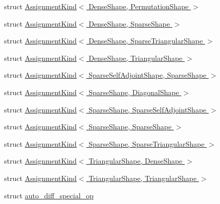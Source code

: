\begin{DoxyCompactItemize}
\item 
struct \hyperlink{struct_eigen_1_1internal_1_1_assignment_kind_3_01_dense_shape_00_01_permutation_shape_01_4}{Assignment\+Kind$<$ Dense\+Shape, Permutation\+Shape $>$}
\item 
struct \hyperlink{struct_eigen_1_1internal_1_1_assignment_kind_3_01_dense_shape_00_01_sparse_shape_01_4}{Assignment\+Kind$<$ Dense\+Shape, Sparse\+Shape $>$}
\item 
struct \hyperlink{struct_eigen_1_1internal_1_1_assignment_kind_3_01_dense_shape_00_01_sparse_triangular_shape_01_4}{Assignment\+Kind$<$ Dense\+Shape, Sparse\+Triangular\+Shape $>$}
\item 
struct \hyperlink{struct_eigen_1_1internal_1_1_assignment_kind_3_01_dense_shape_00_01_triangular_shape_01_4}{Assignment\+Kind$<$ Dense\+Shape, Triangular\+Shape $>$}
\item 
struct \hyperlink{struct_eigen_1_1internal_1_1_assignment_kind_3_01_sparse_self_adjoint_shape_00_01_sparse_shape_01_4}{Assignment\+Kind$<$ Sparse\+Self\+Adjoint\+Shape, Sparse\+Shape $>$}
\item 
struct \hyperlink{struct_eigen_1_1internal_1_1_assignment_kind_3_01_sparse_shape_00_01_diagonal_shape_01_4}{Assignment\+Kind$<$ Sparse\+Shape, Diagonal\+Shape $>$}
\item 
struct \hyperlink{struct_eigen_1_1internal_1_1_assignment_kind_3_01_sparse_shape_00_01_sparse_self_adjoint_shape_01_4}{Assignment\+Kind$<$ Sparse\+Shape, Sparse\+Self\+Adjoint\+Shape $>$}
\item 
struct \hyperlink{struct_eigen_1_1internal_1_1_assignment_kind_3_01_sparse_shape_00_01_sparse_shape_01_4}{Assignment\+Kind$<$ Sparse\+Shape, Sparse\+Shape $>$}
\item 
struct \hyperlink{struct_eigen_1_1internal_1_1_assignment_kind_3_01_sparse_shape_00_01_sparse_triangular_shape_01_4}{Assignment\+Kind$<$ Sparse\+Shape, Sparse\+Triangular\+Shape $>$}
\item 
struct \hyperlink{struct_eigen_1_1internal_1_1_assignment_kind_3_01_triangular_shape_00_01_dense_shape_01_4}{Assignment\+Kind$<$ Triangular\+Shape, Dense\+Shape $>$}
\item 
struct \hyperlink{struct_eigen_1_1internal_1_1_assignment_kind_3_01_triangular_shape_00_01_triangular_shape_01_4}{Assignment\+Kind$<$ Triangular\+Shape, Triangular\+Shape $>$}
\item 
struct \hyperlink{struct_eigen_1_1internal_1_1auto__diff__special__op}{auto\+\_\+diff\+\_\+special\+\_\+op}
\item 

\end{DoxyCompactItemize}
